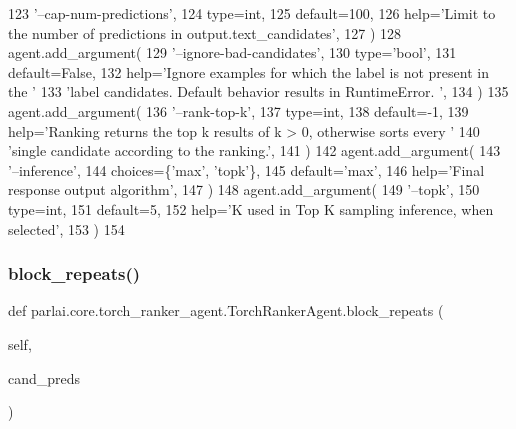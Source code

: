 \begin{DoxyCode}
123             \textcolor{stringliteral}{'--cap-num-predictions'},
124             type=int,
125             default=100,
126             help=\textcolor{stringliteral}{'Limit to the number of predictions in output.text\_candidates'},
127         )
128         agent.add\_argument(
129             \textcolor{stringliteral}{'--ignore-bad-candidates'},
130             type=\textcolor{stringliteral}{'bool'},
131             default=\textcolor{keyword}{False},
132             help=\textcolor{stringliteral}{'Ignore examples for which the label is not present in the '}
133             \textcolor{stringliteral}{'label candidates. Default behavior results in RuntimeError. '},
134         )
135         agent.add\_argument(
136             \textcolor{stringliteral}{'--rank-top-k'},
137             type=int,
138             default=-1,
139             help=\textcolor{stringliteral}{'Ranking returns the top k results of k > 0, otherwise sorts every '}
140             \textcolor{stringliteral}{'single candidate according to the ranking.'},
141         )
142         agent.add\_argument(
143             \textcolor{stringliteral}{'--inference'},
144             choices=\{\textcolor{stringliteral}{'max'}, \textcolor{stringliteral}{'topk'}\},
145             default=\textcolor{stringliteral}{'max'},
146             help=\textcolor{stringliteral}{'Final response output algorithm'},
147         )
148         agent.add\_argument(
149             \textcolor{stringliteral}{'--topk'},
150             type=int,
151             default=5,
152             help=\textcolor{stringliteral}{'K used in Top K sampling inference, when selected'},
153         )
154 
\end{DoxyCode}
\mbox{\label{classparlai_1_1core_1_1torch__ranker__agent_1_1TorchRankerAgent_a628050d71339298baafbaf678f94207d}} 
\subsubsection{\texorpdfstring{block\+\_\+repeats()}{block\_repeats()}}
{\footnotesize\ttfamily def parlai.\+core.\+torch\+\_\+ranker\+\_\+agent.\+Torch\+Ranker\+Agent.\+block\+\_\+repeats (\begin{DoxyParamCaption}\item[{}]{self,  }\item[{}]{cand\+\_\+preds }\end{DoxyParamCaption})}

